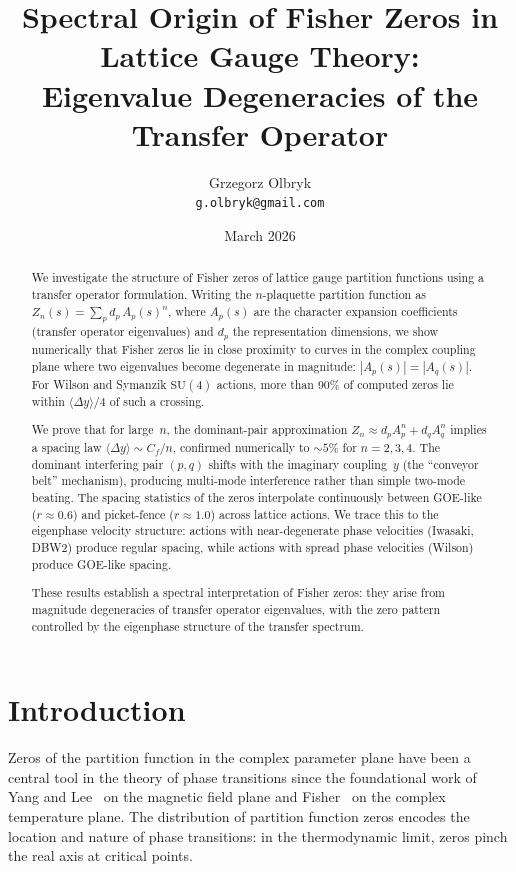 \documentclass[12pt]{article}
\title{Spectral Origin of Fisher Zeros in Lattice Gauge Theory:\\
Eigenvalue Degeneracies of the Transfer Operator}
\author{Grzegorz Olbryk\\[-2pt]
\small\texttt{g.olbryk@gmail.com}}
\date{March 2026}
\theoremstyle{definition}
\theoremstyle{remark}
\newcommand{\SU}{\mathrm{SU}}
\newcommand{\avg}[1]{\langle #1 \rangle}
\begin{document}
\maketitle

\begin{abstract}
We investigate the structure of Fisher zeros of lattice gauge partition
functions using a transfer operator formulation.  Writing the
$n$-plaquette partition function as $Z_n(s) = \sum_p d_p\, A_p(s)^n$,
where $A_p(s)$ are the character expansion coefficients (transfer
operator eigenvalues) and $d_p$ the representation dimensions, we show
numerically that Fisher zeros lie in close proximity to curves in the
complex coupling plane where two eigenvalues become degenerate in
magnitude: $|A_p(s)| = |A_q(s)|$.  For Wilson and Symanzik
$\SU(4)$ actions, more than 90\% of computed zeros lie within
$\avg{\Delta y}/4$ of such a crossing.

We prove that for large~$n$, the dominant-pair approximation
$Z_n \approx d_p A_p^n + d_q A_q^n$ implies a spacing law
$\avg{\Delta y} \sim C_f/n$, confirmed numerically to ${\sim}5\%$ for
$n = 2,3,4$.  The dominant interfering pair $(p,q)$ shifts with the
imaginary coupling~$y$ (the ``conveyor belt'' mechanism), producing
multi-mode interference rather than simple two-mode beating.  The
spacing statistics of the zeros interpolate continuously between
GOE-like ($r \approx 0.6$) and picket-fence ($r \approx 1.0$)
across lattice actions.  We trace this to the eigenphase velocity
structure: actions with near-degenerate phase velocities (Iwasaki,
DBW2) produce regular spacing, while actions with spread phase
velocities (Wilson) produce GOE-like spacing.

These results establish a spectral interpretation of Fisher zeros:
they arise from magnitude degeneracies of transfer operator
eigenvalues, with the zero pattern controlled by the eigenphase
structure of the transfer spectrum.
\end{abstract}


\section{Introduction}
\label{sec:intro}

Zeros of the partition function in the complex parameter plane have
been a central tool in the theory of phase transitions since the
foundational work of Yang and Lee~\cite{YangLee1952} on the magnetic
field plane and Fisher~\cite{Fisher1965} on the complex temperature
plane.  The distribution of partition function zeros encodes the
location and nature of phase transitions: in the thermodynamic limit,
zeros pinch the real axis at critical points.
\end{document}
